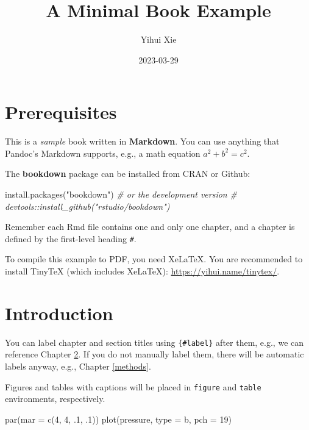 \documentclass[
]{book}
\title{A Minimal Book Example}
\author{Yihui Xie}
\date{2023-03-29}
\newenvironment{Shaded}{\begin{snugshade}}{\end{snugshade}}
\newcommand{\AttributeTok}[1]{\textcolor[rgb]{0.77,0.63,0.00}{#1}}
\newcommand{\CommentTok}[1]{\textcolor[rgb]{0.56,0.35,0.01}{\textit{#1}}}
\newcommand{\DecValTok}[1]{\textcolor[rgb]{0.00,0.00,0.81}{#1}}
\newcommand{\FunctionTok}[1]{\textcolor[rgb]{0.00,0.00,0.00}{#1}}
\newcommand{\NormalTok}[1]{#1}
\newcommand{\StringTok}[1]{\textcolor[rgb]{0.31,0.60,0.02}{#1}}
\begin{document}
\maketitle

{
\setcounter{tocdepth}{1}
\tableofcontents
}
\hypertarget{prerequisites}{%
\chapter{Prerequisites}\label{prerequisites}}

This is a \emph{sample} book written in \textbf{Markdown}. You can use anything that Pandoc's Markdown supports, e.g., a math equation \(a^2 + b^2 = c^2\).

The \textbf{bookdown} package can be installed from CRAN or Github:

\begin{Shaded}
\begin{Highlighting}[]
\FunctionTok{install.packages}\NormalTok{(}\StringTok{"bookdown"}\NormalTok{)}
\CommentTok{\# or the development version}
\CommentTok{\# devtools::install\_github("rstudio/bookdown")}
\end{Highlighting}
\end{Shaded}

Remember each Rmd file contains one and only one chapter, and a chapter is defined by the first-level heading \texttt{\#}.

To compile this example to PDF, you need XeLaTeX. You are recommended to install TinyTeX (which includes XeLaTeX): \url{https://yihui.name/tinytex/}.

\hypertarget{intro}{%
\chapter{Introduction}\label{intro}}

You can label chapter and section titles using \texttt{\{\#label\}} after them, e.g., we can reference Chapter \ref{intro}. If you do not manually label them, there will be automatic labels anyway, e.g., Chapter \ref{methods}.

Figures and tables with captions will be placed in \texttt{figure} and \texttt{table} environments, respectively.

\begin{Shaded}
\begin{Highlighting}[]
\FunctionTok{par}\NormalTok{(}\AttributeTok{mar =} \FunctionTok{c}\NormalTok{(}\DecValTok{4}\NormalTok{, }\DecValTok{4}\NormalTok{, .}\DecValTok{1}\NormalTok{, .}\DecValTok{1}\NormalTok{))}
\FunctionTok{plot}\NormalTok{(pressure, }\AttributeTok{type =} \StringTok{\textquotesingle{}b\textquotesingle{}}\NormalTok{, }\AttributeTok{pch =} \DecValTok{19}\NormalTok{)}
\end{Highlighting}
\end{Shaded}
\end{document}
